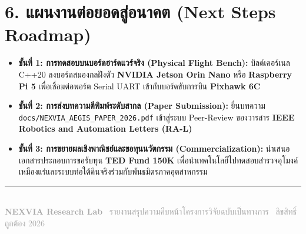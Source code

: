 \documentclass[10pt,a4paper]{article}
\begin{document}
\vspace{6pt}

\section*{\textcolor{primary}{6. แผนงานต่อยอดสู่อนาคต (Next Steps Roadmap)}}

\begin{itemize}[leftmargin=18pt, itemsep=5pt]
  \item \textbf{ขั้นที่ 1: การทดสอบบนบอร์ดฮาร์ดแวร์จริง (Physical Flight Bench):} บิลด์เคอร์เนล C++20 ลงบอร์ดสมองกลฝังตัว \textbf{NVIDIA Jetson Orin Nano} หรือ \textbf{Raspberry Pi 5} เพื่อเชื่อมต่อพอร์ต Serial UART เข้ากับบอร์ดขับการบิน \textbf{Pixhawk 6C}
  \item \textbf{ขั้นที่ 2: การส่งบทความตีพิมพ์ระดับสากล (Paper Submission):} ยื่นบทความ \texttt{docs/NEXVIA\_AEGIS\_PAPER\_2026.pdf} เข้าสู่ระบบ Peer-Review ของวารสาร \textbf{IEEE Robotics and Automation Letters (RA-L)}
  \item \textbf{ขั้นที่ 3: การขยายผลเชิงพาณิชย์และขอทุนนวัตกรรม (Commercialization):} นำเสนอเอกสารประกอบการขอรับทุน \textbf{TED Fund 150K} เพื่อนำเทคโนโลยีไปทดสอบสำรวจอุโมงค์เหมืองแร่และระบบท่อใต้ดินจริงร่วมกับพันธมิตรภาคอุตสาหกรรม
\end{itemize}

\vspace{12pt}
\begin{center}
  \textcolor{darkgray}{\rule{0.6\textwidth}{0.4pt}}\\[4pt]
  {\footnotesize \textcolor{darkgray}{\textbf{NEXVIA Research Lab} \textbar\ รายงานสรุปความคืบหน้าโครงการวิจัยฉบับเป็นทางการ \textbar\ ลิขสิทธิ์ถูกต้อง 2026}}
\end{center}
\end{document}
